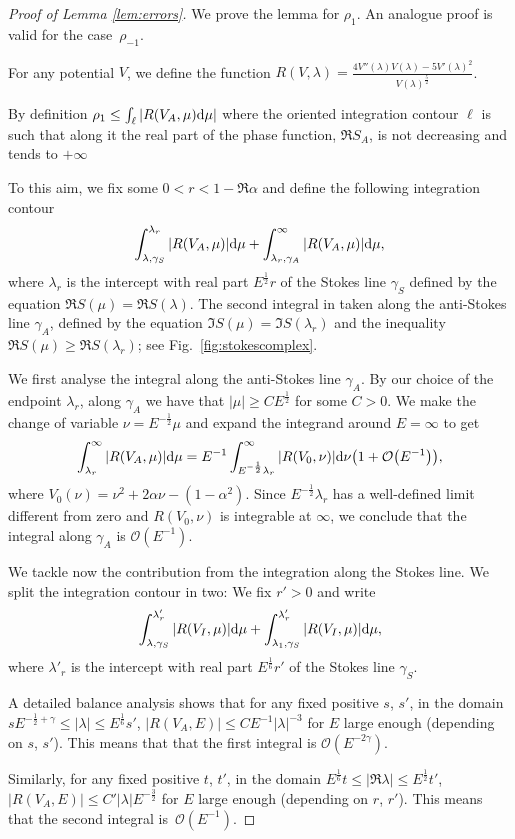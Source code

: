 \documentclass[pdftex]{sigma}
\numberwithin{equation}{section}
\newcommand{\la}{\lambda}
\newcommand{\al}{\alpha}
\begin{document}
\begin{proof}[Proof of Lemma \ref{lem:errors}]
We prove the lemma for $\rho_1$. An analogue proof is valid for the case~$\rho_{-1}$.
	
For any potential $V$, we def\/ine the function $R(V,\la)=\frac{4V''(\la)V(\la)-5V'(\la)^2}{V(\la)^\frac52}$.
	
By def\/inition $\rho_{1}\leq \int_{\ell} | R(V_A,\mu) {\rm d}\mu|$ where the oriented integration contour $\ell$ is such that
	along it the real part of the phase function, $\Re{S_A}$, is not decreasing and tends to $+\infty$
	
	To this aim, we f\/ix some $0<r< 1-\Re \al$ and def\/ine the following integration contour
	\begin{gather*}
	\int_{\la,\gamma_S}^{\la_r} |R(V_A,\mu)| {\rm d}\mu +\int_{\la_r,\gamma_A}^{\infty}|R(V_A,\mu)| {\rm d}\mu,
	\end{gather*}
	where $\la_r$ is the intercept with real part $E^{\frac12}r$ of
	the Stokes line $\gamma_S$ def\/ined by the equation $\Re S(\mu)=\Re S(\la)$. The second integral in taken along the anti-Stokes
	line $\gamma_A$, def\/ined by the equation
	$\Im S(\mu)=\Im S(\la_r)$ and the inequality $\Re S(\mu)\geq \Re S(\la_r)$; see Fig.~\ref{fig:stokescomplex}.
	
	We f\/irst analyse the integral along the anti-Stokes line $\gamma_A$. By our choice of the endpoint $\la_r$,
	along $\gamma_A$ we have that $|\mu|\geq C E^{\frac12}$ for some $C>0$.
	We make the change of variable $\nu=E^{-\frac12}\mu$ and expand the integrand around $E=\infty$ to get
	\begin{gather*}
	\int_{\la_r}^{\infty} |R(V_A,\mu)| {\rm d}\mu = E^{-1}\int_{E^{-\frac12}\la_r}^{\infty} |R(V_0,\nu)| {\rm d}\nu\big(1+\mathcal{O}\big(E^{-1}\big)\big),
	\end{gather*}
	where $V_0(\nu)=\nu^2+2\al \nu-(1-\al^2)$. Since $E^{-\frac12}\la_r$ has a well-def\/ined limit dif\/ferent from zero and
	$R(V_0,\nu)$ is integrable at $\infty$, we conclude that the integral along $\gamma_A$ is $\mathcal{O}(E^{-1})$.
	
	We tackle now the contribution from the integration along the Stokes line.
	We split the integration contour in two: We f\/ix $r'>0$ and write
	\begin{gather*}
	\int_{\la,\gamma_S}^{\la'_r} |R(V_I,\mu)| {\rm d}\mu + \int_{\la_1,\gamma_S}^{\la'_r} |R(V_I,\mu)| {\rm d}\mu,
	\end{gather*}
	where $\la'_r$ is the intercept with real part $E^{\frac16}r'$ of the Stokes line $\gamma_S$.
	
A detailed balance analysis shows that for any f\/ixed positive $s$, $s'$, 	in the domain $s E^{-\frac12+\gamma}\leq|\la|\leq E^{\frac16} s'$, $|R(V_A,E)|\leq C E^{-1}|\la|^{-3}$ for $E$ large enough (depending on $s$, $s'$). This means that that the f\/irst integral is $\mathcal{O}(E^{-2\gamma})$.
	
Similarly, for any f\/ixed positive $t$, $t'$, in the domain $ E^{\frac16} t \leq|\Re \la |\leq E^{\frac12} t'$, $|R(V_A,E)|\leq C' |\la| E^{-\frac32}$ for $E$ large enough (depending on $r$, $r'$). This means that the second integral is~$\mathcal{O}(E^{-1})$.
\end{proof}
\end{document}

